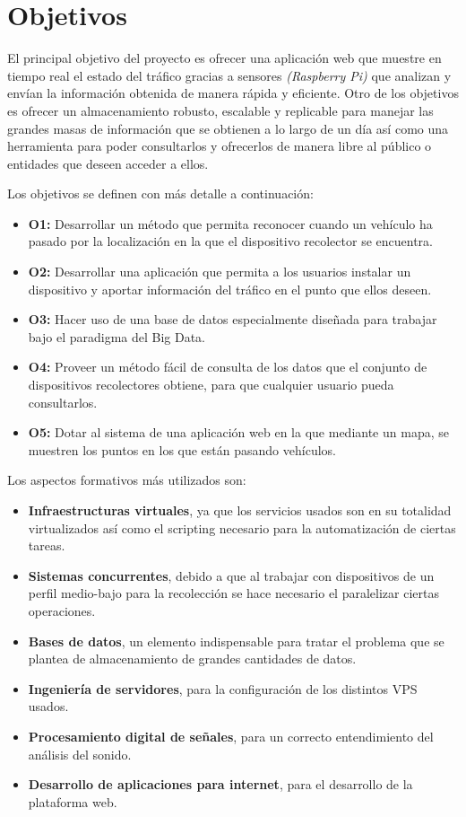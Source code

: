 \chapter{Objetivos}

El principal objetivo del proyecto es ofrecer una aplicación web que muestre en tiempo real el estado del tráfico gracias a sensores \textit{(Raspberry Pi)} que analizan y envían la información obtenida de manera rápida y eficiente. Otro de los objetivos es ofrecer un almacenamiento robusto, escalable y replicable para manejar las grandes masas de información que se obtienen a lo largo de un día así como una herramienta para poder consultarlos y ofrecerlos de manera libre al público o entidades que deseen acceder a ellos.

\bigskip
Los objetivos se definen con más detalle a continuación:

\begin{itemize}
  \item \textbf{O1:} Desarrollar un método que permita reconocer cuando un vehículo ha pasado por la localización en la que el dispositivo recolector se encuentra.
  \item \textbf{O2:} Desarrollar una aplicación que permita a los usuarios instalar un dispositivo y aportar información del tráfico en el punto que ellos deseen.
  \item \textbf{O3:} Hacer uso de una base de datos especialmente diseñada para trabajar bajo el paradigma del Big Data.
  \item \textbf{O4:} Proveer un método fácil de consulta de los datos que el conjunto de dispositivos recolectores obtiene, para que cualquier usuario pueda consultarlos.
  \item \textbf{O5:} Dotar al sistema de una aplicación web en la que mediante un mapa, se muestren los puntos en los que están pasando vehículos.
\end{itemize}

\bigskip
Los aspectos formativos más utilizados son:
\begin{itemize}
  \item \textbf{Infraestructuras virtuales}, ya que los servicios usados son en su totalidad virtualizados así como el scripting necesario para la automatización de ciertas tareas.
  \item \textbf{Sistemas concurrentes}, debido a que al trabajar con dispositivos de un perfil medio-bajo para la recolección se hace necesario el paralelizar ciertas operaciones.
  \item \textbf{Bases de datos}, un elemento indispensable para tratar el problema que se plantea de almacenamiento de grandes cantidades de datos.
  \item \textbf{Ingeniería de servidores}, para la configuración de los distintos VPS usados.
  \item \textbf{Procesamiento digital de señales}, para un correcto entendimiento del análisis del sonido.
  \item \textbf{Desarrollo de aplicaciones para internet}, para el desarrollo de la plataforma web.
\end{itemize}

